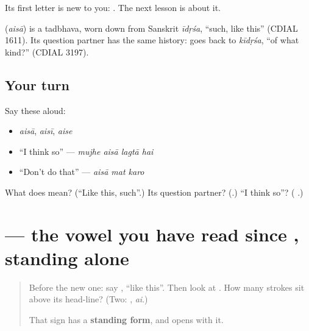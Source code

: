 Its first letter is new to you: \textbf{}. The next lesson is about it.

\begin{cousinweb}
\textbf{} (\emph{aisā}) is a tadbhava, worn down from Sanskrit \emph{īdṛśa}, \textquotedblleft{}such, like this\textquotedblright{} (CDIAL 1611). Its question partner has the same history: \textbf{} goes back to \emph{kīdṛśa}, \textquotedblleft{}of what kind?\textquotedblright{} (CDIAL 3197).
\end{cousinweb}

\subsection*{Your turn}
Say these aloud:

\begin{itemize}
\raggedright
  \item \emph{aisā}, \emph{aisī}, \emph{aise}
  \item \textquotedblleft{}I think so\textquotedblright{} — \emph{mujhe aisā lagtā hai}
  \item \textquotedblleft{}Don't do that\textquotedblright{} — \emph{aisā mat karo}
\end{itemize}

\begin{tcolorbox}[breakable,colback=teal!4,colframe=teal!35!black,title={Before you move on}]
What does \textbf{} mean? (\textquotedblleft{}Like this, such\textquotedblright{}.) Its question partner? (\textbf{}.) \textquotedblleft{}I think so\textquotedblright{}? (\textbf{   }.)
\end{tcolorbox}
\section[\texorpdfstring{\hi{ऐ} (ai)}{ऐ (ai)}]{ — the vowel you have read since , standing alone}

\label{lesson:HI-W280-letter-ai}



\begin{quote}
Before the new one: say \textbf{}, \textquotedblleft{}like this\textquotedblright{}. Then look at \textbf{}. How many strokes sit above its head-line? (Two: \textbf{}, \emph{ai}.)

That sign has a \textbf{standing form}, and \textbf{} opens with it.
\end{quote}

